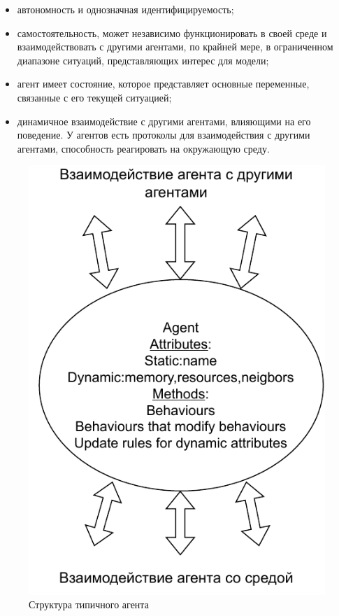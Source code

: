 \begin{itemize}[leftmargin=1.6\parindent]
	\item 	автономность и однозначная идентифицируемость;
	\item самостоятельность, может независимо функционировать в своей среде и взаимодействовать с другими агентами, по крайней мере, в ограниченном диапазоне ситуаций, представляющих интерес для модели;
	\item агент имеет состояние, которое представляет основные переменные, связанные с его текущей ситуацией;
	\item динамичное взаимодействие с другими агентами, влияющими на его поведение. У агентов есть протоколы для взаимодействия с другими агентами, способность реагировать на окружающую среду. 

\end{itemize}

\begin{figure}[hbtp]
	\centering
	\includegraphics[scale=0.8]{img/typical-agent.drawio.pdf}
	\caption{Структура типичного агента}
	\label{typical-agent}
\end{figure}

